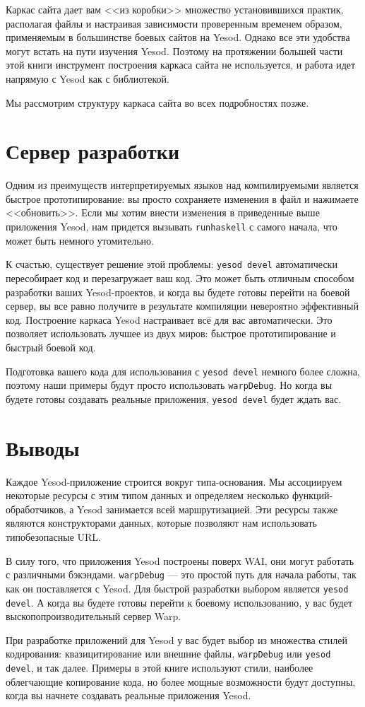 Каркас сайта дает вам <<из коробки>> множество установившихся практик, располагая файлы и
настраивая зависимости проверенным временем образом, применяемым в большинстве боевых
сайтов на Yesod. Однако все эти удобства могут встать на пути изучения Yesod. Поэтому на
протяжении большей части этой книги инструмент построения каркаса сайта не используется, и
работа идет напрямую с Yesod как с библиотекой.

Мы рассмотрим структуру каркаса сайта во всех подробностях позже.

\section{Сервер разработки}

Одним из преимуществ интерпретируемых языков над компилируемыми является быстрое
прототипирование: вы просто сохраняете изменения в файл и нажимаете <<обновить>>. Если мы
хотим внести изменения в приведенные выше приложения Yesod, нам придется вызывать
\lstinline!runhaskell! с самого начала, что может быть немного утомительно.

К счастью, существует решение этой проблемы: \lstinline'yesod devel' автоматически
пересобирает код и перезагружает ваш код. Это может быть отличным способом разработки
ваших Yesod-проектов, и когда вы будете готовы перейти на боевой сервер, вы все равно
получите в результате компиляции невероятно эффективный код. Построение каркаса Yesod
настраивает всё для вас автоматически. Это позволяет использовать лучшее из двух миров:
быстрое прототипирование и быстрый боевой код.

Подготовка вашего кода для использования с \lstinline!yesod devel! немного более сложна,
поэтому наши примеры будут просто использовать \lstinline!warpDebug!. Но когда вы будете
готовы создавать реальные приложения, \lstinline'yesod devel' будет ждать вас.

\section{Выводы}

Каждое Yesod-приложение строится вокруг типа-основания.  Мы ассоциируем некоторые ресурсы
с этим типом данных и определяем несколько функций-обработчиков, а Yesod занимается всей
маршрутизацией. Эти ресурсы также являются конструкторами данных, которые позволяют нам
использовать типобезопасные URL.

В силу того, что приложения Yesod построены поверх WAI, они могут работать с различными
бэкэндами. \lstinline!warpDebug! --- это простой путь для начала работы, так как он
поставляется с Yesod. Для быстрой разработки выбором является \lstinline!yesod devel!. А
когда вы будете готовы перейти к боевому использованию, у вас будет
выскопопроизводительный сервер Warp.

При разработке приложений для Yesod у вас будет выбор из множества стилей кодирования:
квазицитирование или внешние файлы, \lstinline{warpDebug} или \lstinline'yesod devel', и
так далее. Примеры в этой книге используют стили, наиболее облегчающие копирование кода,
но более мощные возможности будут доступны, когда вы начнете создавать реальные приложения
Yesod.
